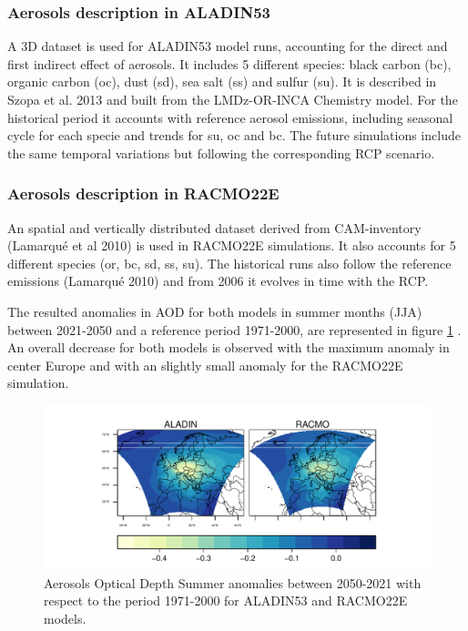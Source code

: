 \subsubsection{Aerosols description in ALADIN53}

A 3D dataset is used for ALADIN53 model runs, accounting for the direct and first indirect effect of aerosols. It includes 5 different species: black carbon (bc), organic carbon (oc), dust (sd), sea salt (ss) and sulfur (su). It is described in Szopa et al. 2013 and built from the LMDz-OR-INCA Chemistry model. For the historical period it accounts with reference aerosol emissions, including seasonal cycle for each specie and trends for su, oc and bc. The future simulations include the same temporal variations but following the corresponding RCP scenario. 

\subsubsection{Aerosols description in RACMO22E}

An spatial and vertically distributed dataset derived from CAM-inventory (Lamarqué et al 2010) is used in RACMO22E simulations. It also accounts for 5 different species (or, bc, sd, ss, su). The historical runs also follow the reference emissions (Lamarqué 2010) and from 2006 it evolves in time with the RCP.

The resulted anomalies in AOD for both models in summer months (JJA) between 2021-2050 and a reference period 1971-2000, are represented in figure \ref{fig:aod} . An overall decrease for both models is observed with the maximum anomaly in center Europe and with an slightly small anomaly for the RACMO22E simulation.

\begin{figure}[h!]
\centering\includegraphics[width=1\textwidth]{figs/capitulo7/ANOMALIAS_JJA_AOD_2050-2021_r12.pdf}
\caption{Aerosols Optical Depth Summer anomalies between 2050-2021 with respect to the period 1971-2000 for ALADIN53 and RACMO22E models.}
\label{fig:aod}
\end{figure}

